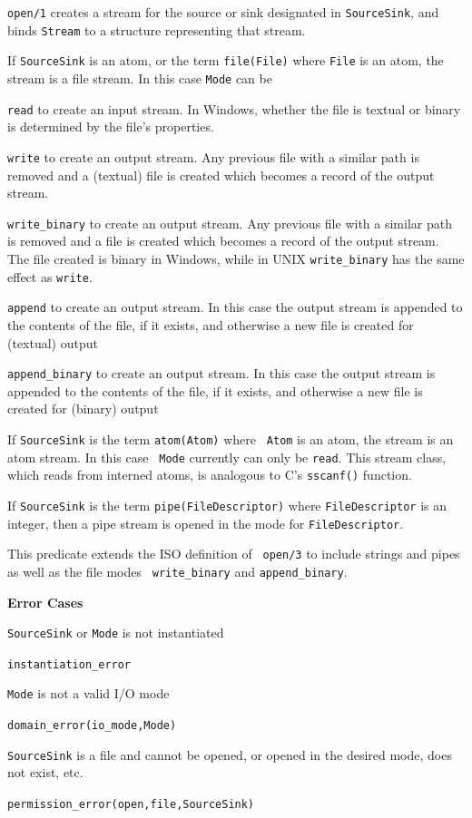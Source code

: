 \begin{description}

%
{\tt open/1} creates a stream for the source or sink designated in
{\tt SourceSink}, and binds {\tt Stream} to a structure representing
that stream.  
%
\bi
\item If {\tt SourceSink} is an atom, or the term {\tt file(File)}
where {\tt File} is an atom, the stream is a file stream.  In this
case {\tt Mode} can be 
\bi
\item {\tt read} to create an input stream.  In Windows, whether the
file is textual or binary is determined by the file's properties.
%
\item {\tt write} to create an output stream.  Any previous file with
a similar path is removed and a (textual) file is created which becomes
a record of the output stream.  
%
\item {\tt write\_binary} to create an output stream.  Any previous file with
a similar path is removed and a file is created which becomes
a record of the output stream.  The file created is binary in Windows,
while in UNIX {\tt write\_binary} has the same effect as {\tt write}.
%
\item {\tt append} to create an output stream.  In this case the
output stream is appended to the contents of the file, if it exists,
and otherwise a new file is created for (textual) output
%
\item {\tt append\_binary} to create an output stream.  In this case the
output stream is appended to the contents of the file, if it exists,
and otherwise a new file is created for (binary) output
\ei
\item If {\tt SourceSink} is the term {\tt atom(Atom)} where {\tt
Atom} is an atom, the stream is an atom stream.  In this case {\tt
Mode} currently can only be {\tt read}.  This stream class, which
reads from interned atoms, is analogous to C's {\tt sscanf()}
function.
%
\item If {\tt SourceSink} is the term {\tt pipe(FileDescriptor)}
where {\tt FileDescriptor} is an integer, then a pipe stream is opened
in the mode for {\tt FileDescriptor}.
\ei

\compatibility This predicate extends the ISO definition of {\tt
open/3} to include strings and pipes as well as the file modes {\tt
write\_binary} and {\tt append\_binary}.

{\bf Error Cases}
\bi
\item 	{\tt SourceSink} or {\tt Mode} is not instantiated
\bi
\item 	{\tt instantiation\_error}
\ei
%
\item 	{\tt Mode} is not a valid I/O mode
\bi
\item 	{\tt domain\_error(io\_mode,Mode)}
\ei
%
\item {\tt SourceSink} is a file and cannot be opened, or opened in
  the desired mode, does not exist, etc.
\bi
\item 	{\tt permission\_error(open,file,SourceSink)}
\ei
\ei


\end{description}

